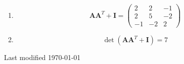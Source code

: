 \documentclass[11pt,a4paper]{article}
\def\bA{\mathbf{A}}
\def\bI{\mathbf{I}}
\begin{document}
\begin{enumerate}
{\begin{enumerate}
\item \[ \bA \bA^T + \bI= \left(
\begin{array}{ccc}
 2 & 2 & -1 \\
 2 & 5 & -2 \\
 -1 & -2 & 2
\end{array}
\right) \]
\item \[ \det( \bA \bA^T + \bI)=7 \] 

\end{enumerate}
\noindent\hrulefill	

}{}%


\end{enumerate}
\hfill {\tiny Last modified  \today}
\vfill\eject
\end{document}
